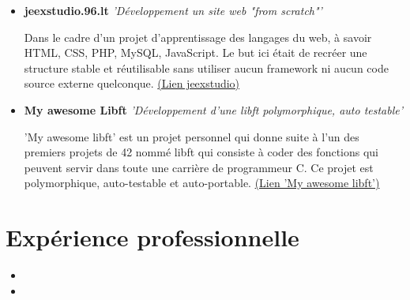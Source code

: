 \documentclass[11pt,a4paper,sans]{moderncv}        %
\begin{document}
\begin{itemize}
	
	\item{\textbf{jeexstudio.96.lt}  \textit{'Développement un site web "from scratch"'}
		
		\vspace{3pt}
		
		\small{Dans le cadre d'un projet d'apprentissage des langages du web, à savoir HTML, CSS, PHP, MySQL, JavaScript. Le but ici était de recréer une structure stable et réutilisable sans utiliser aucun framework ni aucun code source externe quelconque. \href{http://jeexstudio.96.lt/Pagepremierevisite/JeexStudio.php}{(Lien jeexstudio)}}}

	\vspace{6pt}
	
	\item{\textbf{My awesome Libft}  \textit{'Développement d'une libft polymorphique, auto testable'}
		
		\vspace{3pt}
		
		\small{'My awesome libft' est un projet personnel qui donne suite à l'un des premiers projets de 42 nommé libft qui consiste à coder des fonctions qui peuvent servir dans toute une carrière de programmeur C. Ce projet est polymorphique, auto-testable et auto-portable.  \href{https://github.com/FauconFan/my_awesome_libft}{(Lien 'My awesome libft')}}}
	
\end{itemize}

\section{Expérience professionnelle}

\vspace{6pt}

\begin{itemize}

\item{}

\vspace{6pt}

\item{}

\end{itemize}
\end{document}
